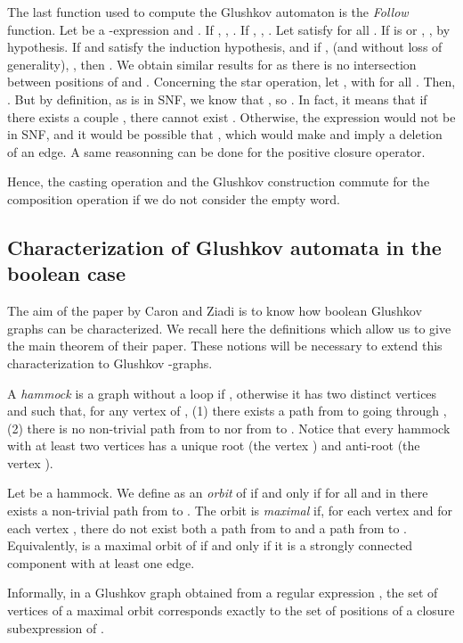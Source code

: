 \documentclass[11pt]{article}
\begin{document}
The last function used to compute the Glushkov automaton is the {\it Follow} function. 
Let  be a -expression and  . If , , 
. 
If , , .  
Let  satisfy  for all .  
If  is  or , ,  by hypothesis. If  and  satisfy the induction  hypothesis, and if , (and  without loss of generality), , then . We obtain similar results for  as there is no intersection between positions of  and .
Concerning the star operation, let , with  for all . Then, .   But by definition, as  is in SNF, we know that , so . In fact, it means that if there exists a couple , there cannot exist . Otherwise, the expression would not be in SNF, and it would be possible that , which would make  and imply a deletion of an edge. A same reasonning can be done for the positive closure operator.

Hence, the casting operation  and the Glushkov construction commute for the composition operation if we do not consider the empty word.
\cqfd

 


\subsection{Characterization of Glushkov automata in the boolean case}\label{Glushkov-Charac}
The aim of the paper by Caron and Ziadi  \cite{CZ97} is to know how boolean Glushkov graphs can be characterized. We recall here the definitions which allow us to give the main theorem of their paper. These notions will be necessary to extend this characterization to Glushkov -graphs.

A {\it hammock} is a graph   without a loop if , otherwise  it has two distinct  vertices   and  such that, for any vertex   of ,
(1) there exists a path from   to   going through ,
(2) there is no non-trivial path from   to  nor from   to . Notice that every hammock with at least two vertices has a unique root (the vertex ) and anti-root (the vertex ). 


Let  be a hammock.
 We define  as an {\it orbit} of  if and only if  for all  and  in  there exists a non-trivial path from  to .
The orbit  is {\it maximal}  if, for each vertex  and for each vertex , there do not exist both a path from  to  and a path from  to . Equivalently,  is a maximal orbit of  if and only if it is a strongly connected component with at least one edge.

Informally, in a Glushkov graph obtained from a regular expression , the set of vertices of a maximal orbit corresponds exactly to the set of positions of a closure subexpression of .
\end{document}
